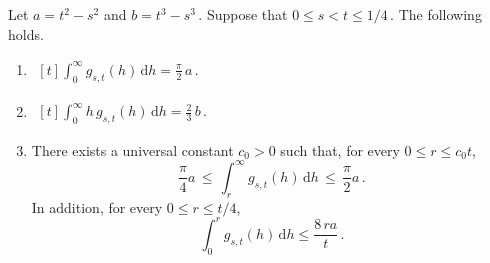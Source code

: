 \documentclass[ECP,preprint]{ejpecp} %
\newcommand{\1}{\mathbf 1}
\renewcommand{\d}{\mathrm d}
\begin{document}
\begin{lemma} \label{lem:chord-estimates}
Let
\(
    a = t^2-s^2
\)
and
\(
    b=t^3-s^3 \, .
\)
Suppose that
\(
    0\le s<t\le 1/4 \, .
\)
The following holds.

\begin{enumerate}[label=\textup{(\roman*)}]
\item
\(  \displaystyle
    \begin{aligned}[t]
    \int_0^\infty g_{s,t}(h)\, \d h
    =
    \frac{\pi}{2} \, a  \, .
    \end{aligned}
\)

\item
\( \displaystyle
    \begin{aligned}[t]
    \int_0^\infty h\,g_{s,t}(h)\, \d h
    =
    \frac{2}{3} \, b \, .
    \end{aligned}
\)


\item There exists a universal constant \(c_0>0\) such that, for every
    \(0\le r\le c_0t\),
    \begin{equation} \label{eq-geom-(iv)-i}
        \frac{\pi}{4} a
        \, \le \,
        \int_r^\infty g_{s,t}(h)\,\d h
        \, \le \, 
        \frac{\pi}{2}a \, .
    \end{equation}
    In addition, for every $0 \leq r \leq t/4$, 
    \begin{equation} \label{eq-geom-(iv)-ii}
        \int_0^r g_{s,t}(h) \, \d h \leq \frac{8 \,  r a}{t} \, .
    \end{equation}
\end{enumerate}
\end{lemma}
\end{document}
